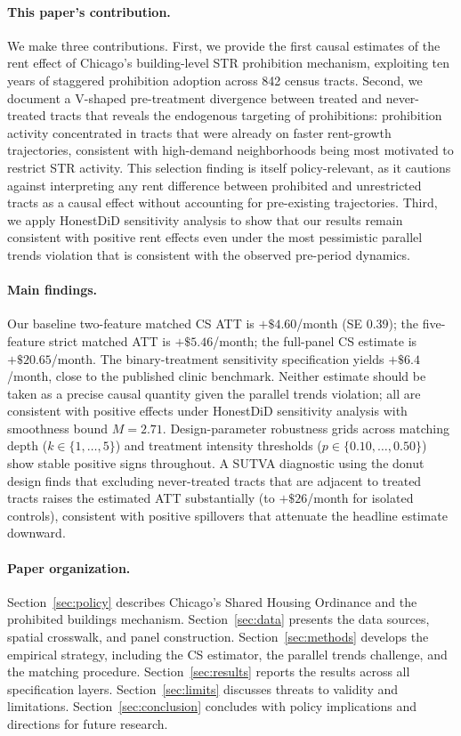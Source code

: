 \paragraph{This paper's contribution.} We make three contributions. First, we provide the first causal estimates of the rent effect of Chicago's building-level STR prohibition mechanism, exploiting ten years of staggered prohibition adoption across 842 census tracts. Second, we document a V-shaped pre-treatment divergence between treated and never-treated tracts that reveals the endogenous targeting of prohibitions: prohibition activity concentrated in tracts that were already on faster rent-growth trajectories, consistent with high-demand neighborhoods being most motivated to restrict STR activity. This selection finding is itself policy-relevant, as it cautions against interpreting any rent difference between prohibited and unrestricted tracts as a causal effect without accounting for pre-existing trajectories. Third, we apply HonestDiD sensitivity analysis to show that our results remain consistent with positive rent effects even under the most pessimistic parallel trends violation that is consistent with the observed pre-period dynamics.

\paragraph{Main findings.} Our baseline two-feature matched CS ATT is $+\$4.60$/month (SE 0.39); the five-feature strict matched ATT is $+\$5.46$/month; the full-panel CS estimate is $+\$20.65$/month. The binary-treatment sensitivity specification yields $+\$6.4$/month, close to the published clinic benchmark. Neither estimate should be taken as a precise causal quantity given the parallel trends violation; all are consistent with positive effects under HonestDiD sensitivity analysis with smoothness bound $M = 2.71$. Design-parameter robustness grids across matching depth ($k \in \{1, \ldots, 5\}$) and treatment intensity thresholds ($p \in \{0.10, \ldots, 0.50\}$) show stable positive signs throughout. A SUTVA diagnostic using the donut design finds that excluding never-treated tracts that are adjacent to treated tracts raises the estimated ATT substantially (to $+\$26$/month for isolated controls), consistent with positive spillovers that attenuate the headline estimate downward.

\paragraph{Paper organization.} Section~\ref{sec:policy} describes Chicago's Shared Housing Ordinance and the prohibited buildings mechanism. Section~\ref{sec:data} presents the data sources, spatial crosswalk, and panel construction. Section~\ref{sec:methods} develops the empirical strategy, including the CS estimator, the parallel trends challenge, and the matching procedure. Section~\ref{sec:results} reports the results across all specification layers. Section~\ref{sec:limits} discusses threats to validity and limitations. Section~\ref{sec:conclusion} concludes with policy implications and directions for future research.
